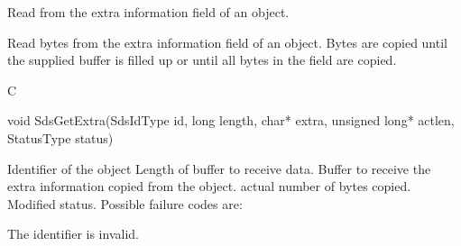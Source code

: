 \begin{manroutinedescription}
      Read from the extra information field of an object.

      Read bytes from the extra information field of an object. Bytes are
      copied until the supplied buffer is filled up or until all bytes
      in the field are copied.

      C

      void SdsGetExtra(SdsIdType id, long length, char* extra,
          unsigned long* actlen, StatusType {\mantt{*}} {} %
status)

\begin{manparametertable}
 Identifier of the object
  Length of buffer to receive data.
 Buffer to receive the extra %
information
                            copied from the object.
 actual number of bytes %
copied.
 Modified status. Possible %
failure codes are:
\end{manparametertable}
\begin{mantwocolumntable}
The identifier is invalid.
\end{mantwocolumntable}
\end{manroutinedescription}

